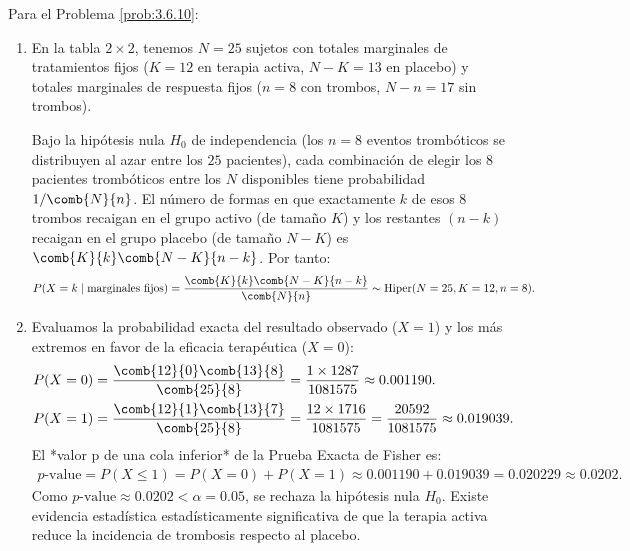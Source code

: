 \begin{solucion}
	\label{sol:3.6.10}
	Para el Problema \ref{prob:3.6.10}:
	\begin{enumerate}
		\item En la tabla $2 \times 2$, tenemos $N=25$ sujetos con totales marginales de tratamientos fijos ($K=12$ en terapia activa, $N-K=13$ en placebo) y totales marginales de respuesta fijos ($n=8$ con trombos, $N-n=17$ sin trombos).
		
		Bajo la hipótesis nula $H_0$ de independencia (los $n=8$ eventos trombóticos se distribuyen al azar entre los $25$ pacientes), cada combinación de elegir los $8$ pacientes trombóticos entre los $N$ disponibles tiene probabilidad $1/\comb{N}{n}$. El número de formas en que exactamente $k$ de esos $8$ trombos recaigan en el grupo activo (de tamaño $K$) y los restantes $(n-k)$ recaigan en el grupo placebo (de tamaño $N-K$) es $\comb{K}{k}\comb{N-K}{n-k}$. Por tanto:
		\begin{align*}
			P(X = k \mid \text{marginales fijos}) = \dfrac{\comb{K}{k}\comb{N-K}{n-k}}{\comb{N}{n}} \sim \text{Hiper}(N=25, K=12, n=8).
		\end{align*}
		\item Evaluamos la probabilidad exacta del resultado observado ($X=1$) y los más extremos en favor de la eficacia terapéutica ($X=0$):
		\begin{align*}
			P(X = 0) &= \dfrac{\comb{12}{0}\comb{13}{8}}{\comb{25}{8}} = \dfrac{1 \times 1287}{1081575} \approx 0.001190. \\
			P(X = 1) &= \dfrac{\comb{12}{1}\comb{13}{7}}{\comb{25}{8}} = \dfrac{12 \times 1716}{1081575} = \dfrac{20592}{1081575} \approx 0.019039.
		\end{align*}
		El *valor p de una cola inferior* de la Prueba Exacta de Fisher es:
		\begin{align*}
			p\text{-value} = P(X \le 1) = P(X=0) + P(X=1) \approx 0.001190 + 0.019039 = 0.020229 \approx 0.0202.
		\end{align*}
		Como $p\text{-value} \approx 0.0202 < \alpha = 0.05$, se rechaza la hipótesis nula $H_0$. Existe evidencia estadística estadísticamente significativa de que la terapia activa reduce la incidencia de trombosis respecto al placebo.
	\end{enumerate}
\end{solucion}


